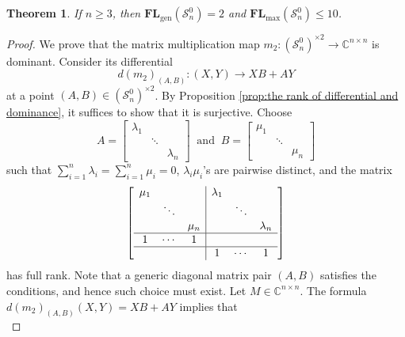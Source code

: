 \documentclass[reqno]{amsart}
\newtheorem{theorem}{Theorem}[section]
\theoremstyle{definition}
\numberwithin{equation}{section}
\begin{document}
\begin{theorem}\label{thm:the generic length of traceless symmetric matrix structure}
    If $n \geq 3$, then  $\mathbf{FL}_{\text{gen}}(\mathcal{S}_n^0)=2$ and $\mathbf{FL}_{\text{max}}(\mathcal{S}_n^0)\leq 10$.
\end{theorem}
\begin{proof}
    We prove that the matrix multiplication map $m_2:(\mathcal{S}_n^0)^{\times 2} \rightarrow \mathbb{C}^{n \times n}$ is dominant. Consider its differential
    \begin{equation*}
        d(m_2)_{(A,B)}: (X,Y) \rightarrow XB+AY
    \end{equation*}
    at a point $(A,B) \in (\mathcal{S}_n^0)^{\times 2}$. By Proposition \ref{prop:the rank of differential and dominance}, it suffices to show that it is surjective. Choose 
    \begin{equation*}
        A=\begin{bmatrix}
            \lambda_1 &  & \\
             & \ddots & \\
             & & \lambda_n
        \end{bmatrix}~\text{ and }~B=\begin{bmatrix}
            \mu_1 &  & \\
             & \ddots & \\
             & & \mu_n
        \end{bmatrix}
    \end{equation*}
    such that $\sum_{i=1}^n \lambda_i=\sum_{i=1}^n \mu_i=0$, $\lambda_i\mu_i$'s are pairwise distinct, and the matrix 
    \begin{equation*}
        \left[\begin{array}{ccc|ccc}
             \mu_1 & & & \lambda_1 & & \\
             & \ddots &  & & \ddots & \\
             & & \mu_n & & & \lambda_n \\ \hline
             1 & \cdots & 1 & & &\\ \hline
             & & & 1 & \cdots & 1
        \end{array}\right]
    \end{equation*}
    has full rank. Note that a generic diagonal matrix pair $(A,B)$ satisfies the conditions, and hence such choice must exist. Let $M \in \mathbb{C}^{n \times n}$. The formula $d(m_2)_{(A,B)}(X,Y)=XB+AY$ implies that 
    \begin{equation*}

\end{equation*}
\end{proof}
\end{document}
